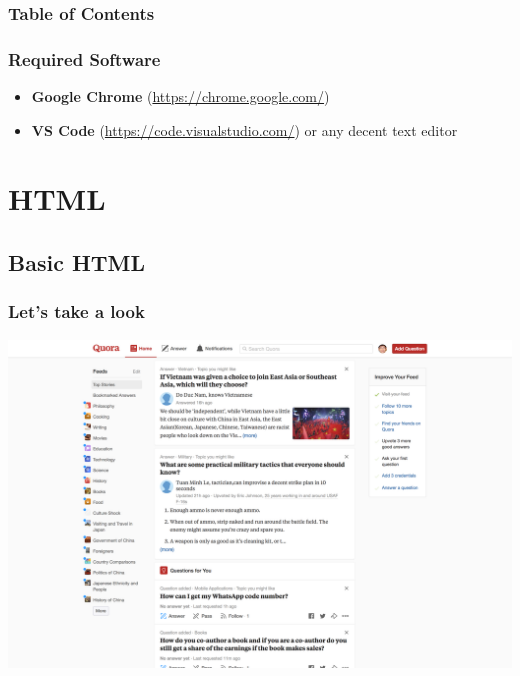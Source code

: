 \documentclass[12pt]{beamer}
\begin{document}
\begin{frame}
\frametitle{Table of Contents}
\tableofcontents
\end{frame}

\begin{frame}
\frametitle{Required Software}
\begin{itemize}
	\item \textbf{Google Chrome} (\url{https://chrome.google.com/})
	\item \textbf{VS Code} (\url{https://code.visualstudio.com/}) or any decent text editor
\end{itemize}
\end{frame}

\section{HTML}
\subsection{Basic HTML}
\begin{frame}
\frametitle{Let's take a look}
\begin{center}
	\includegraphics[width=\linewidth]{quora}
\end{center}
\end{frame}
\end{document}
